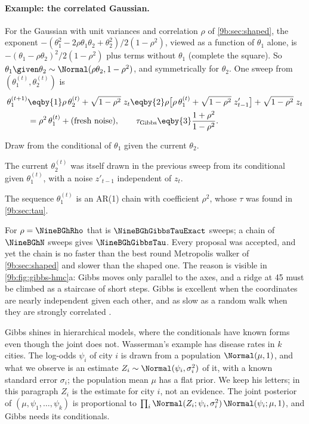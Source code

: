 \paragraph{Example: the correlated Gaussian.}
For the Gaussian with unit variances and correlation $\rho$ of \cref{9b:sec:shaped}, the exponent
$-(\theta_1^2-2\rho\theta_1\theta_2+\theta_2^2)/2(1-\rho^2)$, viewed as a function of $\theta_1$
alone, is $-(\theta_1-\rho\theta_2)^2/2(1-\rho^2)$ plus terms without $\theta_1$ (complete the
square). So $\theta_1\given\theta_2\sim\Normal(\rho\theta_2,1-\rho^2)$, and symmetrically for
$\theta_2$. One sweep from $(\theta_1^{(t)},\theta_2^{(t)})$ is
\begin{align}
  \theta_1^{(t+1)}
  &\eqby{1}\rho\,\theta_2^{(t)}+\sqrt{1-\rho^2}\;z_t
   \eqby{2}\rho\bigl[\rho\,\theta_1^{(t)}+\sqrt{1-\rho^2}\;z'_{t-1}\bigr]+\sqrt{1-\rho^2}\;z_t
  \nonumber\\
  &=\rho^2\,\theta_1^{(t)}+\text{(fresh noise)},
  \qquad
  \tau_{\rm Gibbs}\eqby{3}\frac{1+\rho^2}{1-\rho^2}.
  \label{9b:eq:gibbs-ar1}
\end{align}
\begin{explain}
  \item Draw from the conditional of $\theta_1$ given the current $\theta_2$.
  \item The current $\theta_2^{(t)}$ was itself drawn in the previous sweep from its conditional
        given $\theta_1^{(t)}$, with a noise $z'_{t-1}$ independent of $z_t$.
  \item The sequence $\theta_1^{(t)}$ is an AR(1) chain with coefficient $\rho^2$, whose $\tau$ was
        found in \cref{9b:sec:tau}.
\end{explain}
For $\rho=\NineBGhRho$ that is $\NineBGhGibbsTauExact$ sweeps; a chain of $\NineBGhN$ sweeps
gives $\NineBGhGibbsTau$. Every proposal was accepted, and yet the chain is no faster than the best
round Metropolis walker of \cref{9b:sec:shaped} and slower than the shaped one. The reason is
visible in \cref{9b:fig:gibbs-hmc}a: Gibbs moves only parallel to the axes, and a ridge at
45\textdegree{} must be climbed as a staircase of short steps. Gibbs is excellent when the
coordinates are nearly independent given each other, and as slow as a random walk when they are
strongly correlated .

Gibbs shines in hierarchical models, where the conditionals have known forms even though the
joint does not. Wasserman's example  has disease rates in $k$
cities. The log-odds $\psi_i$ of city $i$ is drawn from a population $\Normal(\mu,1)$, and what we
observe is an estimate $Z_i\sim\Normal(\psi_i,\sigma_i^2)$ of it, with a known standard error
$\sigma_i$; the population mean $\mu$ has a flat prior. We keep his letters; in this paragraph
$Z_i$ is the estimate for city $i$, not an evidence. The joint posterior of
$(\mu,\psi_1,\dots,\psi_k)$ is proportional to
$\prod_i\Normal(Z_i;\psi_i,\sigma_i^2)\,\Normal(\psi_i;\mu,1)$, and Gibbs needs its conditionals.

